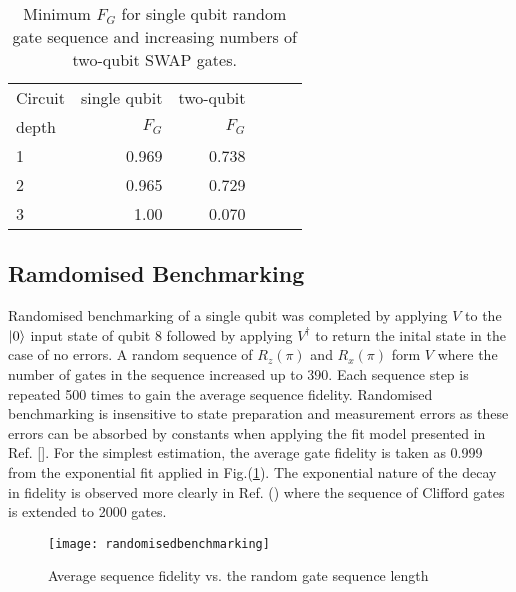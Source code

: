 \begin{table}[h!]
  \begin{center}
    \caption{Minimum $F_{G}$ for single qubit random gate sequence and increasing numbers of two-qubit SWAP gates.}
    \label{tab:table2}
    \begin{tabular}{l|r|r|l|r|r} %
      Circuit & single qubit & two-qubit \\
      depth & $F_{G}$ & $F_{G}$ \\
       \hline
      1 & 0.969 & 0.738 \\
      2 & 0.965 & 0.729 \\
      3 & 1.00 & 0.070 \\          
    \end{tabular}
  \end{center}
\end{table}


  
\subsection{Ramdomised Benchmarking}

Randomised benchmarking of a single qubit was completed by applying $V$ to the $\lvert0\rangle$ input state of qubit 8 followed by applying $V^{\dagger}$ to return the inital state in the case of no errors. A random sequence of $R_{z}(\pi)$ and $R_{x}(\pi)$ form $V$ where the number of gates in the sequence increased up to 390. Each sequence step is repeated 500 times to gain the average sequence fidelity. Randomised benchmarking is insensitive to state preparation and measurement errors as these errors can be absorbed by constants when applying the fit model presented in Ref. []. For the simplest estimation, the average gate fidelity is taken as 0.999 from the exponential fit applied in Fig.(\ref{fig:randomisedbenchmarking}). The exponential nature of the decay in fidelity is observed more clearly in Ref. () where the sequence of Clifford gates is extended to 2000 gates.   

\begin{figure}[t]
\centering
\texttt{[image: randomisedbenchmarking]}
\caption{\label{fig:randomisedbenchmarking}Average sequence fidelity vs. the random gate sequence length} 
\end{figure}



 
